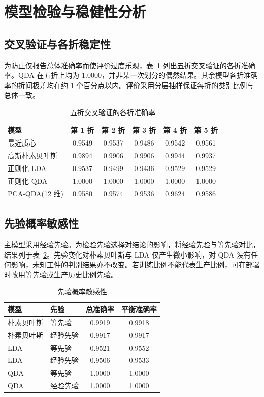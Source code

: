 \documentclass[12pt,a4paper]{article}
\newcommand{\upcite}[1]{\cite{#1}}
\begin{document}
\section{模型检验与稳健性分析}
\subsection{交叉验证与各折稳定性}

为防止仅报告总体准确率而使评价过度乐观，表~\ref{tab:fold} 列出五折交叉验证的各折准确率。QDA 在五折上均为 1.0000，并非某一次划分的偶然结果。其余模型各折准确率的折间极差均在约 1 个百分点以内。评价采用分层抽样保证每折的类别比例与总体一致\upcite{kohavi1995}。

\begin{table}[H]
\centering
\caption{五折交叉验证的各折准确率}
\label{tab:fold}
\begin{tabular}{lccccc}
\toprule
模型 & 第 1 折 & 第 2 折 & 第 3 折 & 第 4 折 & 第 5 折 \\
\midrule
最近质心       & 0.9549 & 0.9537 & 0.9486 & 0.9542 & 0.9561 \\
高斯朴素贝叶斯 & 0.9894 & 0.9906 & 0.9906 & 0.9944 & 0.9937 \\
正则化 LDA     & 0.9537 & 0.9499 & 0.9436 & 0.9529 & 0.9529 \\
正则化 QDA     & 1.0000 & 1.0000 & 1.0000 & 1.0000 & 1.0000 \\
PCA-QDA(12 维) & 0.9580 & 0.9574 & 0.9536 & 0.9624 & 0.9586 \\
\bottomrule
\end{tabular}
\end{table}

\subsection{先验概率敏感性}

主模型采用经验先验。为检验先验选择对结论的影响，将经验先验与等先验对比，结果列于表~\ref{tab:prior}。先验变化对朴素贝叶斯与 LDA 仅产生微小影响，对 QDA 没有任何影响，未知工件的判别结果亦不改变。若训练比例不能代表生产比例，可在部署时改用等先验或生产历史比例先验。

\begin{table}[H]
\centering
\caption{先验概率敏感性}
\label{tab:prior}
\begin{tabular}{llcc}
\toprule
模型 & 先验 & 总准确率 & 平衡准确率 \\
\midrule
朴素贝叶斯 & 等先验   & 0.9919 & 0.9918 \\
朴素贝叶斯 & 经验先验 & 0.9917 & 0.9917 \\
LDA       & 等先验   & 0.9521 & 0.9552 \\
LDA       & 经验先验 & 0.9506 & 0.9533 \\
QDA       & 等先验   & 1.0000 & 1.0000 \\
QDA       & 经验先验 & 1.0000 & 1.0000 \\
\bottomrule
\end{tabular}
\end{table}
\end{document}
